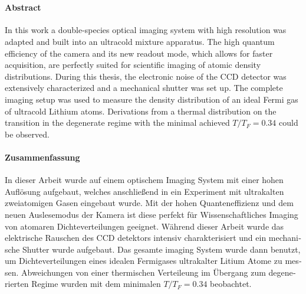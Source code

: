 \cleardoublepage
\thispagestyle{plain}

\makeatletter
\begin{center}
	\large\textbf{\@title}\\
	\normalsize\@author
\end{center}
\makeatother

\paragraph{Abstract}
In this work a double-species optical imaging system with high resolution was adapted and built into an ultracold mixture apparatus. The high quantum efficiency of the camera and its new readout mode, which allows for faster acquisition, are perfectly suited for scientific imaging of atomic density distributions. During this thesis, the electronic noise of the CCD detector was extensively characterized and a mechanical shutter was set up. The complete imaging setup was used to measure the density distribution of an ideal Fermi gas of ultracold Lithium atoms. Derivations from a thermal distribution on the transition in the degenerate regime with the minimal achieved $T/T_F=0.34$ could be observed.


\begin{otherlanguage}{ngerman}

\paragraph{Zusammenfassung}
In dieser Arbeit wurde auf einem optischem Imaging System mit einer hohen Auflösung aufgebaut, welches anschließend in ein Experiment mit ultrakalten zweiatomigen Gasen eingebaut wurde. Mit der hohen Quanteneffizienz und dem neuen Auslesemodus der Kamera ist diese perfekt für Wissenschaftliches Imaging von atomaren Dichteverteilungen geeignet. Während dieser Arbeit wurde das elektrische Rauschen des CCD detektors intensiv charakterisiert und ein mechanische Shutter wurde aufgebaut. Das gesamte imaging System wurde dann benutzt, um Dichteverteilungen eines idealen Fermigases ultrakalter Litium Atome zu messen. Abweichungen von einer thermischen Verteileung im Übergang zum degenerierten Regime wurden mit dem minimalen $T/T_F=0.34$ beobachtet.

\end{otherlanguage}

